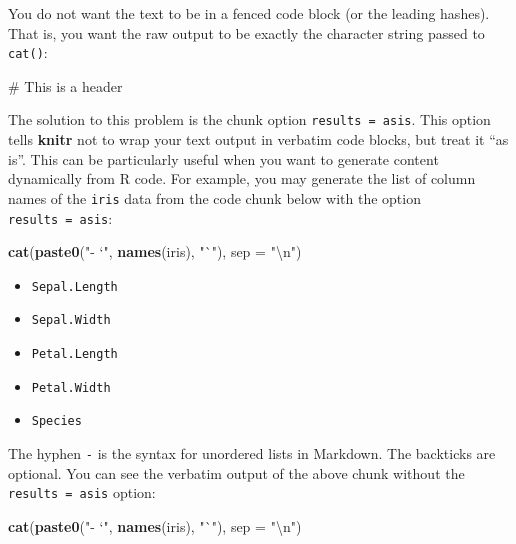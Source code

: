 \documentclass[
  11pt,
]{krantz}
\newenvironment{Shaded}{\begin{snugshade}}{\end{snugshade}}
\newcommand{\CharTok}[1]{\textcolor[rgb]{0.5,0.5,0.5}{#1}}
\newcommand{\DataTypeTok}[1]{\textcolor[rgb]{0.27,0.27,0.27}{#1}}
\newcommand{\FunctionTok}[1]{\textcolor[rgb]{0,0,0}{#1}}
\newcommand{\KeywordTok}[1]{\textcolor[rgb]{0.27,0.27,0.27}{\textbf{#1}}}
\newcommand{\NormalTok}[1]{#1}
\newcommand{\StringTok}[1]{\textcolor[rgb]{0.5,0.5,0.5}{#1}}
\providecommand{\tightlist}{%
  \setlength{\itemsep}{0pt}\setlength{\parskip}{0pt}}
\begin{document}
You do not want the text to be in a fenced code block (or the leading hashes). That is, you want the raw output to be exactly the character string passed to \texttt{cat()}:

\begin{Shaded}
\begin{Highlighting}[]
\FunctionTok{# This is a header}
\end{Highlighting}
\end{Shaded}

The solution to this problem is the chunk option \texttt{results\ =\ \textquotesingle{}asis\textquotesingle{}}. This option tells \textbf{knitr} not to wrap your text output in verbatim code blocks, but treat it ``as is''. This can be particularly useful when you want to generate content dynamically from R code. For example, you may generate the list of column names of the \texttt{iris} data from the code chunk below with the option \texttt{results\ =\ \textquotesingle{}asis\textquotesingle{}}:

\begin{Shaded}
\begin{Highlighting}[]
\KeywordTok{cat}\NormalTok{(}\KeywordTok{paste0}\NormalTok{(}\StringTok{"- `"}\NormalTok{, }\KeywordTok{names}\NormalTok{(iris), }\StringTok{"`"}\NormalTok{), }\DataTypeTok{sep =} \StringTok{"}\CharTok{\textbackslash{}n}\StringTok{"}\NormalTok{)}
\end{Highlighting}
\end{Shaded}

\begin{itemize}
\tightlist
\item
  \texttt{Sepal.Length}
\item
  \texttt{Sepal.Width}
\item
  \texttt{Petal.Length}
\item
  \texttt{Petal.Width}
\item
  \texttt{Species}
\end{itemize}

The hyphen \texttt{-} is the syntax for unordered lists in Markdown. The backticks are optional. You can see the verbatim output of the above chunk without the \texttt{results\ =\ \textquotesingle{}asis\textquotesingle{}} option:

\begin{Shaded}
\begin{Highlighting}[]
\KeywordTok{cat}\NormalTok{(}\KeywordTok{paste0}\NormalTok{(}\StringTok{"- `"}\NormalTok{, }\KeywordTok{names}\NormalTok{(iris), }\StringTok{"`"}\NormalTok{), }\DataTypeTok{sep =} \StringTok{"}\CharTok{\textbackslash{}n}\StringTok{"}\NormalTok{)}
\end{Highlighting}
\end{Shaded}
\end{document}
